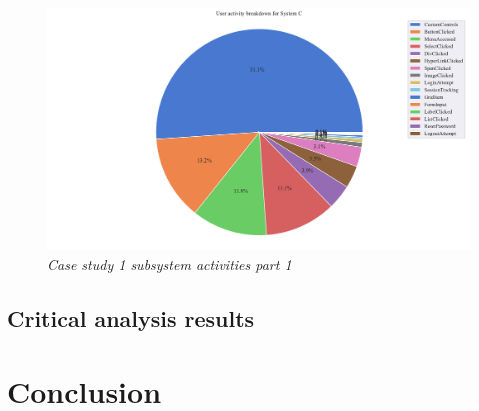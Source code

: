 \begin{figure}[!htb]
	\centering %
	\includegraphics[width=0.95\linewidth]{img/ch3/analysis/case_C_breakdown.pdf}
	\caption[Case study 1 subsystem activities part 1]
	{\textit{Case study 1 subsystem activities part 1}}\label{fig:ch3_caseCBreakdown}
\end{figure}



\clearpage

\subsection{Critical analysis results}

\section{Conclusion}